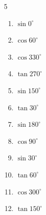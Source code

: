 \begin{multicols}{5}
\begin{enumerate}

  \item $\displaystyle \sin{0^\circ}$

        \phantom{$\displaystyle =0$}

\columnbreak %

\resetques

  \item $\displaystyle \cos{60^\circ}$


  \item $\displaystyle \cos{330^\circ}$


  \item $\displaystyle \tan{270^\circ}$

        \phantom{$\displaystyle なし$}

  \item $\displaystyle \sin{150^\circ}$


  \item $\displaystyle \tan{30^\circ}$


  \item $\displaystyle \sin{180^\circ}$

        \phantom{$\displaystyle =0$}

  \item $\displaystyle \cos{90^\circ}$

        \phantom{$\displaystyle =0$}

  \item $\displaystyle \sin{30^\circ}$


  \item $\displaystyle \tan{60^\circ}$


  \item $\displaystyle \cos{300^\circ}$


  \item $\displaystyle \tan{150^\circ}$



\end{enumerate}
\end{multicols}
